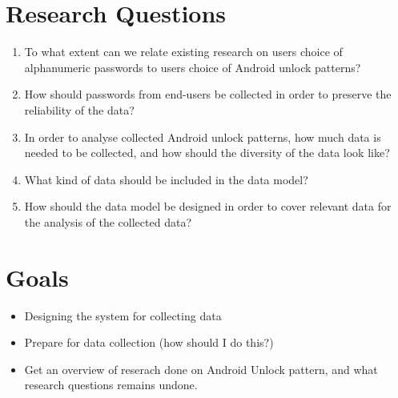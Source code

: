 


\section{Research Questions}

  \begin{enumerate}


      \item To what extent can we relate existing research on users choice of alphanumeric passwords to users choice of Android unlock patterns? 
      \item How should passwords from end-users be collected in order to preserve the reliability of the data? 
      \item In order to analyse collected Android unlock patterns, how much data is needed to be collected, and how should the diversity of the data look like?
      \item What kind of data should be included in the data model?
      \item How should the data model be designed in order to cover relevant data for the analysis of the collected data?  

  \end{enumerate}

\section{Goals}

  \begin{itemize}
        \item Designing the system for collecting data
        \item Prepare for data collection (how should I do this?)
        \item Get an overview of reserach done on Android Unlock pattern, and what research questions remains undone.
  \end{itemize}

